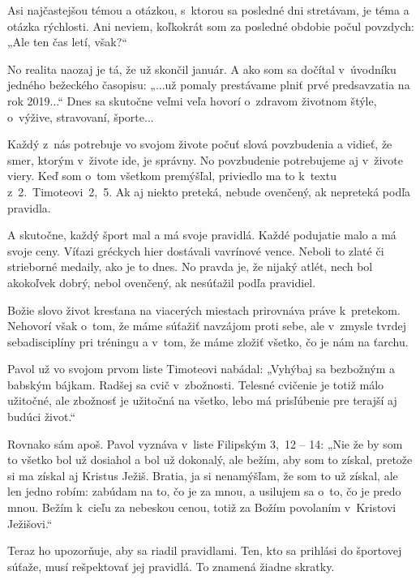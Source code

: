 


Asi najčastejšou témou a otázkou, s~ktorou sa posledné dni stretávam, je téma a otázka rýchlosti. Ani neviem, koľkokrát som za posledné obdobie počul povzdych: „Ale ten čas letí, však?“

No realita naozaj je tá, že už skončil január. A ako som sa dočítal v~úvodníku jedného bežeckého časopisu: „...už pomaly prestávame plniť prvé predsavzatia na rok 2019...“ Dnes sa skutočne veľmi veľa hovorí o~zdravom životnom štýle, o~výžive, stravovaní, športe...

Každý z~nás potrebuje vo svojom živote počuť slová povzbudenia a vidieť, že smer, ktorým v~živote ide, je správny. No povzbudenie potrebujeme aj v~živote viery. Keď som o~tom všetkom premýšľal, priviedlo ma to k~textu z~2.~Timoteovi~2,~5. Ak aj niekto preteká, nebude ovenčený, ak nepreteká podľa pravidla.

A skutočne, každý šport mal a má svoje pravidlá. Každé podujatie malo a má svoje ceny. Víťazi gréckych hier dostávali vavrínové vence. Neboli to zlaté či strieborné medaily, ako je to dnes. No pravda je, že nijaký atlét, nech bol akokoľvek dobrý, nebol ovenčený, ak nesúťažil podľa pravidiel.

Božie slovo život kresťana na viacerých miestach prirovnáva práve k~pretekom. Nehovorí však o~tom, že máme súťažiť navzájom proti sebe, ale v~zmysle tvrdej sebadisciplíny pri tréningu a v~tom, že máme zložiť všetko, čo je nám na ťarchu.

Pavol už vo svojom prvom liste Timoteovi nabádal: „Vyhýbaj sa bezbožným a babským bájkam. Radšej sa cvič v~zbožnosti. Telesné cvičenie je totiž málo užitočné, ale zbožnosť je užitočná na všetko, lebo má prisľúbenie pre terajší aj budúci život.“

Rovnako sám apoš. Pavol vyznáva v~liste Filipským 3,~12 -- 14: „Nie že by som to všetko bol už dosiahol a bol už dokonalý, ale bežím, aby som to získal, pretože si ma získal aj Kristus Ježiš. Bratia, ja si nenamýšľam, že som to už získal, ale len jedno robím: zabúdam na to, čo je za mnou, a usilujem sa o~to, čo je predo mnou. Bežím k~cieľu za nebeskou cenou, totiž za Božím povolaním v~Kristovi Ježišovi.“

Teraz ho upozorňuje, aby sa riadil pravidlami. Ten, kto sa prihlási do športovej súťaže, musí rešpektovať jej pravidlá. To znamená žiadne skratky.

